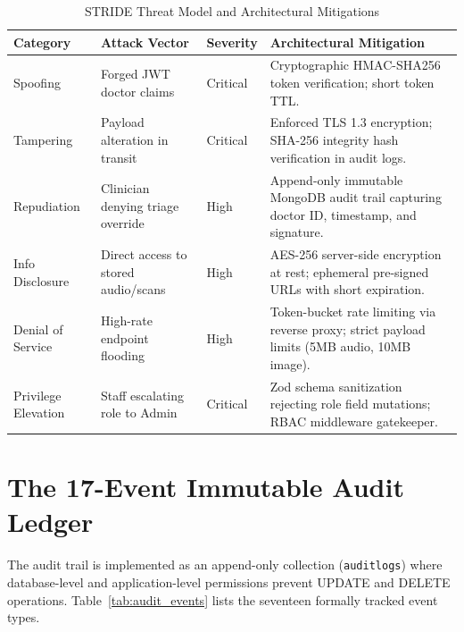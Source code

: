 \documentclass[11pt,a4paper,oneside]{report}
\begin{document}
\begin{table}[htbp]
  \centering
  \small
  \caption{STRIDE Threat Model and Architectural Mitigations}
  \label{tab:stride_matrix}
  \begin{tabularx}{\textwidth}{p{2.2cm}p{3.2cm}p{1.6cm}X}
    \toprule
    \textbf{Category} & \textbf{Attack Vector} & \textbf{Severity} & \textbf{Architectural Mitigation} \\
    \midrule
    Spoofing & Forged JWT doctor claims & Critical & Cryptographic HMAC-SHA256 token verification; short token TTL. \\
    Tampering & Payload alteration in transit & Critical & Enforced TLS 1.3 encryption; SHA-256 integrity hash verification in audit logs. \\
    Repudiation & Clinician denying triage override & High & Append-only immutable MongoDB audit trail capturing doctor ID, timestamp, and signature. \\
    Info Disclosure & Direct access to stored audio/scans & High & AES-256 server-side encryption at rest; ephemeral pre-signed URLs with short expiration. \\
    Denial of Service & High-rate endpoint flooding & High & Token-bucket rate limiting via reverse proxy; strict payload limits (5MB audio, 10MB image). \\
    Privilege Elevation & Staff escalating role to Admin & Critical & Zod schema sanitization rejecting role field mutations; RBAC middleware gatekeeper. \\
    \bottomrule
  \end{tabularx}
\end{table}

\section{The 17-Event Immutable Audit Ledger}
The audit trail is implemented as an append-only collection (\texttt{auditlogs}) where database-level and application-level permissions prevent UPDATE and DELETE operations. Table~\ref{tab:audit_events} lists the seventeen formally tracked event types.
\end{document}
